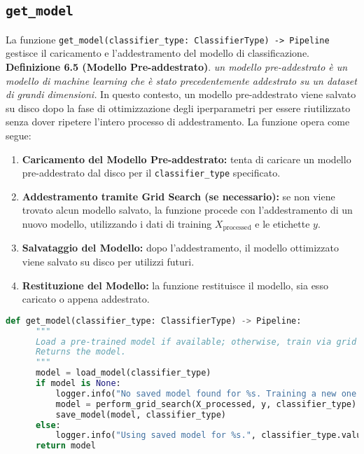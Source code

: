  \subsection{\texttt{get\_model}}

 La funzione \texttt{get\_model(classifier\_type: ClassifierType) -> Pipeline} gestisce il caricamento e l'addestramento del modello di classificazione.\newline
 \textbf{Definizione 6.5 (Modello Pre-addestrato)}. \textit{un modello pre-addestrato è un modello di machine learning che è stato precedentemente addestrato su un dataset di grandi dimensioni.} \newline
 In questo contesto, un modello pre-addestrato viene salvato su disco dopo la fase di ottimizzazione degli iperparametri per essere riutilizzato senza dover ripetere l'intero processo di addestramento. La funzione opera come segue:
 \begin{enumerate}
     \item \textbf{Caricamento del Modello Pre-addestrato:} tenta di caricare un modello pre-addestrato dal disco per il \texttt{classifier\_type} specificato.
     \item \textbf{Addestramento tramite Grid Search (se necessario):} se non viene trovato alcun modello salvato, la funzione procede con l'addestramento di un nuovo modello, utilizzando i dati di training \(X_{\text{processed}}\) e le etichette \(y\).
     \item \textbf{Salvataggio del Modello:} dopo l'addestramento, il modello ottimizzato viene salvato su disco per utilizzi futuri.
     \item \textbf{Restituzione del Modello:} la funzione restituisce il modello, sia esso caricato o appena addestrato.
 \end{enumerate}
\newpage
 \begin{lstlisting}[language=Python,caption={Funzione get\_model}]
  def get_model(classifier_type: ClassifierType) -> Pipeline:
      """
      Load a pre-trained model if available; otherwise, train via grid search and save the model.
      Returns the model.
      """
      model = load_model(classifier_type)
      if model is None:
          logger.info("No saved model found for %s. Training a new one...", classifier_type.value)
          model = perform_grid_search(X_processed, y, classifier_type)
          save_model(model, classifier_type)
      else:
          logger.info("Using saved model for %s.", classifier_type.value)
      return model
 \end{lstlisting}

